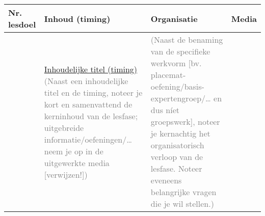 \begin{landscape}
	
	\begin{tabularx}{1.56\textwidth}{|p{1.5cm}|p{6cm}|X|p{4cm}|}
		\hline
		\textbf{Nr. lesdoel } & \textbf{Inhoud (timing)}  & \textbf{Organisatie } & \textbf{Media } \\ \hline
		&\underline{Inhoudelijke titel (timing)}
	    \textcolor{gray}{(Naast een inhoudelijke titel en de timing, noteer je kort en samenvattend de kerninhoud van de lesfase; uitgebreide informatie/oefeningen/… neem je op in de uitgewerkte media [verwijzen!])}
	    &  \textcolor{gray}{(Naast de benaming van de specifieke werkvorm [bv. placemat-oefening/basis-expertengroep/… en dus níet groepswerk], noteer je kernachtig het organisatorisch verloop van de lesfase. Noteer eveneens belangrijke vragen die je wil stellen.) }
		& 
		\\ \hline
	\end{tabularx}
	
	
	
	
	
	
	
	
\end{landscape}
